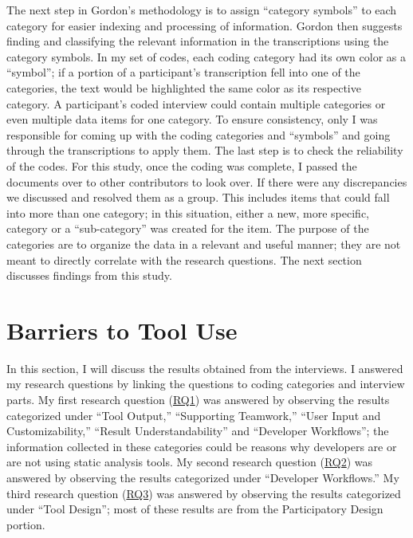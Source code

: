 The next step in Gordon's methodology is to assign ``category symbols'' to each
category for easier indexing and processing of information. Gordon then suggests
finding and classifying the relevant information in the transcriptions using the
category symbols. In my set of codes, each coding category had its own color as a
``symbol''; if a portion of a participant's transcription fell into one of the
categories, the text would be highlighted the same color as its respective
category. A participant's coded interview could contain multiple categories or
even multiple data items for one category. To ensure consistency, only I was
responsible for coming up with the coding categories and ``symbols'' and going
through the transcriptions to apply them. The last step is to check the
reliability of the codes. For this study, once the coding was complete, I passed the documents over to other contributors to look over. 
If there were any discrepancies we discussed and resolved them as a group. This includes items
that could fall into more than one category; in this situation, either a new,
more specific, category or a ``sub-category'' was created for the item. The
purpose of the categories are to organize the data in a relevant and useful
manner; they are not meant to directly correlate with the research questions. 
The next section discusses findings from this study.

\section{Barriers to Tool Use}
\label{sec:barriers}

In this section, I will discuss the results obtained from the interviews. I answered my
research questions by linking the questions to coding categories and interview
parts. My first research question (\hyperlink{RQ1}{RQ1}) was answered by observing the results categorized under ``Tool Output,'' ``Supporting Teamwork,'' ``User Input and
Customizability,'' ``Result Understandability'' and ``Developer Workflows''; the information collected in these categories could be reasons why developers are or
are not using static analysis tools. My second research question (\hyperlink{RQ2}{RQ2}) was answered by observing the results categorized under ``Developer Workflows.'' 
My third research question (\hyperlink{RQ3}{RQ3}) was answered by observing the results categorized under ``Tool Design''; most of these results are from the Participatory Design portion.

